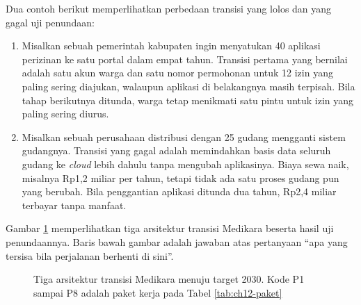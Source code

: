 Dua contoh berikut memperlihatkan perbedaan transisi yang lolos dan yang gagal
uji penundaan:

\begin{enumerate}
  \item Misalkan sebuah pemerintah kabupaten ingin menyatukan 40 aplikasi
        perizinan ke satu portal dalam empat tahun. Transisi pertama yang
        bernilai adalah satu akun warga dan satu nomor permohonan untuk 12 izin
        yang paling sering diajukan, walaupun aplikasi di belakangnya masih
        terpisah. Bila tahap berikutnya ditunda, warga tetap menikmati satu
        pintu untuk izin yang paling sering diurus.
  \item Misalkan sebuah perusahaan distribusi dengan 25 gudang mengganti sistem
        gudangnya. Transisi yang gagal adalah memindahkan basis data seluruh
        gudang ke \textit{cloud} lebih dahulu tanpa mengubah aplikasinya. Biaya
        sewa naik, misalnya Rp1,2 miliar per tahun, tetapi tidak ada satu
        proses gudang pun yang berubah. Bila penggantian aplikasi ditunda dua
        tahun, Rp2,4 miliar terbayar tanpa manfaat.
\end{enumerate}

Gambar \ref{fig:ch12-transisi} memperlihatkan tiga arsitektur transisi Medikara
beserta hasil uji penundaannya. Baris bawah gambar adalah jawaban atas
pertanyaan ``apa yang tersisa bila perjalanan berhenti di sini''.

\begin{figure}[!htb]
  \centering
  
  \caption{Tiga arsitektur transisi Medikara menuju target 2030. Kode P1
           sampai P8 adalah paket kerja pada Tabel \ref{tab:ch12-paket}}
  \label{fig:ch12-transisi}
\end{figure}

